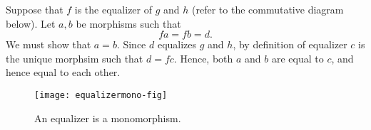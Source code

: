 \documentclass[12pt]{article}
\begin{document}
  Suppose that $f$ is the equalizer of $g$ and $h$ (refer to the commutative
  diagram below).  Let $a,b$ be morphisms such that \[fa=fb=d.\]  We must
  show that $a=b$. Since $d$ equalizes $g$ and $h$, by definition of equalizer
  $c$ is the unique morphsim such that $d=fc$.  Hence, both $a$ and
  $b$ are equal to $c$, and hence equal to each other.
  \begin{figure}[h]
    \centering
    \texttt{[image: equalizermono-fig]}
    \caption{An equalizer is a monomorphism.}
  \end{figure}
\end{document}
